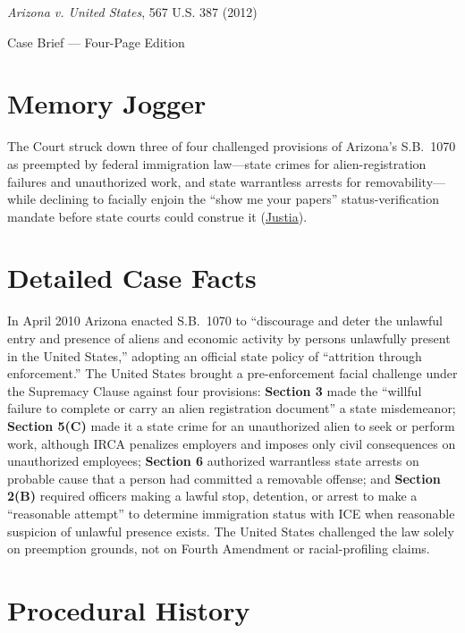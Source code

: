 \documentclass[12pt]{article}
\begin{document}
\begin{center}
{\LARGE \textit{Arizona v. United States}, 567 U.S. 387 (2012)\par}
\vspace{0.8em}
{\large Case Brief --- Four-Page Edition\par}
\end{center}
\vspace{1em}

\section{Memory Jogger}

The Court struck down three of four challenged provisions of Arizona's S.B.~1070 as preempted by federal immigration law---state crimes for alien-registration failures and unauthorized work, and state warrantless arrests for removability---while declining to facially enjoin the ``show me your papers'' status-verification mandate before state courts could construe it (\href{https://supreme.justia.com/cases/federal/us/567/387/}{Justia}).

\section{Detailed Case Facts}

In April 2010 Arizona enacted S.B.~1070 to ``discourage and deter the unlawful entry and presence of aliens and economic activity by persons unlawfully present in the United States,'' adopting an official state policy of ``attrition through enforcement.'' The United States brought a pre-enforcement facial challenge under the Supremacy Clause against four provisions: \textbf{Section 3} made the ``willful failure to complete or carry an alien registration document'' a state misdemeanor; \textbf{Section 5(C)} made it a state crime for an unauthorized alien to seek or perform work, although IRCA penalizes employers and imposes only civil consequences on unauthorized employees; \textbf{Section 6} authorized warrantless state arrests on probable cause that a person had committed a removable offense; and \textbf{Section 2(B)} required officers making a lawful stop, detention, or arrest to make a ``reasonable attempt'' to determine immigration status with ICE when reasonable suspicion of unlawful presence exists. The United States challenged the law solely on preemption grounds, not on Fourth Amendment or racial-profiling claims.

\section{Procedural History}
\end{document}
